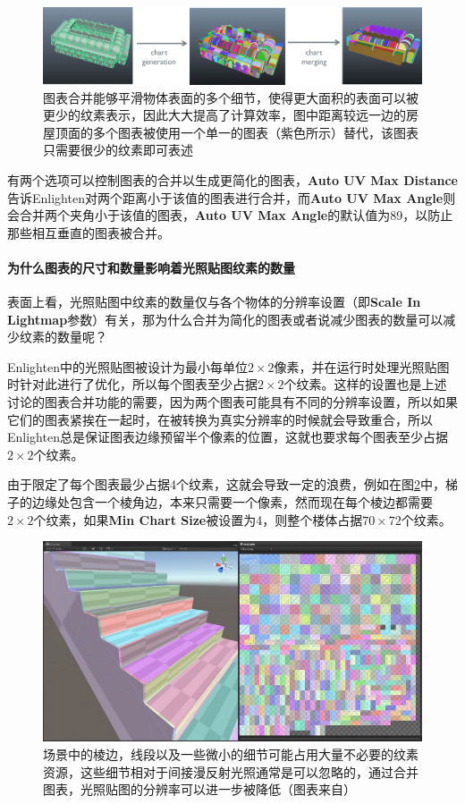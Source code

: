 \begin{figure}
	\includegraphics[width=1.\textwidth]{figures/r/chart-merging}
	\caption{图表合并能够平滑物体表面的多个细节，使得更大面积的表面可以被更少的纹素表示，因此大大提高了计算效率，图中距离较远一边的房屋顶面的多个图表被使用一个单一的图表（紫色所示）替代，该图表只需要很少的纹素即可表述}
	\label{f:r-chart-merging}
\end{figure}

有两个选项可以控制图表的合并以生成更简化的图表，\textbf{Auto UV Max Distance}告诉Enlighten对两个距离小于该值的图表进行合并，而\textbf{Auto UV Max Angle}则会合并两个夹角小于该值的图表，\textbf{Auto UV Max Angle}的默认值为89，以防止那些相互垂直的图表被合并。




\paragraph{为什么图表的尺寸和数量影响着光照贴图纹素的数量}
表面上看，光照贴图中纹素的数量仅与各个物体的分辨率设置（即\textbf{Scale In Lightmap}参数）有关，那为什么合并为简化的图表或者说减少图表的数量可以减少纹素的数量呢？

Enlighten中的光照贴图被设计为最小每单位$2\times 2$像素，并在运行时处理光照贴图时针对此进行了优化，所以每个图表至少占据$2\times 2$个纹素。这样的设置也是上述讨论的图表合并功能的需要，因为两个图表可能具有不同的分辨率设置，所以如果它们的图表紧挨在一起时，在被转换为真实分辨率的时候就会导致重合，所以Enlighten总是保证图表边缘预留半个像素的位置，这就也要求每个图表至少占据$2\times 2$个纹素。

由于限定了每个图表最少占据4个纹素，这就会导致一定的浪费，例如在图\ref{f:r-charts}中，梯子的边缘处包含一个棱角边，本来只需要一个像素，然而现在每个棱边都需要$2\times 2$个纹素，如果\textbf{Min Chart Size}被设置为4，则整个楼体占据$70\times 72$个纹素。

\begin{figure}
	\includegraphics[width=1.\textwidth]{figures/r/chart}
	\caption{场景中的棱边，线段以及一些微小的细节可能占用大量不必要的纹素资源，这些细节相对于间接漫反射光照通常是可以忽略的，通过合并图表，光照贴图的分辨率可以进一步被降低（图表来自\cite{a:AwesomeRealtimeGIondesktopsandConsoles}）}
	\label{f:r-charts}
\end{figure}

